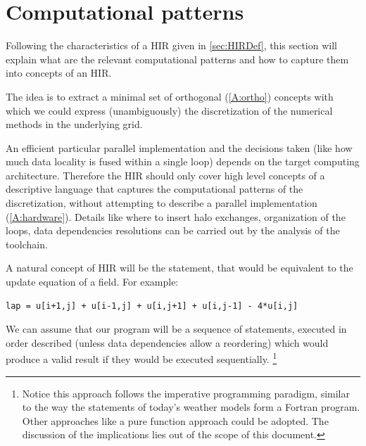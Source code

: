 \documentclass[a4paper,10pt]{scrartcl}
\begin{document}
\section{Computational patterns}
\label{sec:comppatterns}
Following the characteristics of a HIR given in \cref{sec:HIRDef}, this section will explain 
what are the relevant computational patterns and how to capture them into concepts of an HIR.

The idea is to extract a minimal set of orthogonal (\ref{A:ortho}) concepts with which we could express (unambiguously) the discretization of the numerical methods in the underlying grid.

An efficient particular parallel implementation and the decisions taken (like how much data locality is fused within a single loop) depends on the target computing architecture. Therefore the HIR should only cover high level concepts of a descriptive language that captures the computational patterns of the discretization, without attempting to describe a parallel implementation (\ref{A:hardware}). 
Details like where to insert halo exchanges, organization of the loops, data dependencies resolutions can be carried out by the analysis of the toolchain.

A natural concept of HIR will be the statement, that would be equivalent to the update equation of a field. For example:
\begin{lstlisting}
lap = u[i+1,j] + u[i-1,j] + u[i,j+1] + u[i,j-1] - 4*u[i,j]
\end{lstlisting}

\begin{longfbox}[rounded]
	We can assume that our program will be a sequence of statements, executed in order described (unless data dependencies allow a reordering) which would produce a valid result if they would be executed sequentially. \footnote{Notice this approach follows the imperative programming paradigm, similar to the way the statements of today's weather models form a Fortran program. Other approaches like a pure function approach could be adopted. The discussion of the implications lies out of the scope of this document.}
\end{longfbox}
\end{document}
